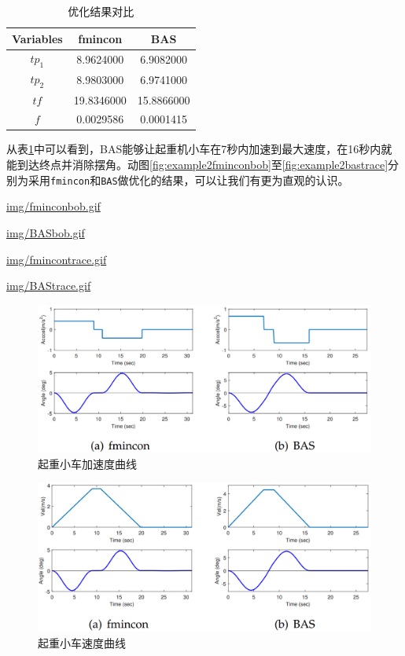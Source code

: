 \documentclass[]{ctexbook}
\begin{document}
\begin{table}[t]

\caption{\label{tab:example2result}优化结果对比}
\centering
\begin{tabular}{ccc}
\toprule
Variables & fmincon & BAS\\
\midrule
$tp_1$ & 8.9624000 & 6.9082000\\
$tp_2$ & 8.9803000 & 6.9741000\\
$tf$ & 19.8346000 & 15.8866000\\
$f$ & 0.0029586 & 0.0001415\\
\bottomrule
\end{tabular}
\end{table}

从表\ref{tab:example2result}中可以看到，BAS能够让起重机小车在7秒内加速到最大速度，在16秒内就能到达终点并消除摆角。动图\ref{fig:example2fminconbob}至\ref{fig:example2bastrace}分别为采用\texttt{fmincon}和\texttt{BAS}做优化的结果，可以让我们有更为直观的认识。

\url{img/fminconbob.gif}

\url{img/BASbob.gif}

\url{img/fmincontrace.gif}

\url{img/BAStrace.gif}

\begin{figure}

{\centering \includegraphics[width=0.7\linewidth]{img/ex2_1} 

}

\caption{起重小车加速度曲线}\label{fig:ex2accel}
\end{figure}

\begin{figure}

{\centering \includegraphics[width=0.7\linewidth]{img/ex2_2} 

}

\caption{起重小车速度曲线}\label{fig:ex2velocity}
\end{figure}
\end{document}
